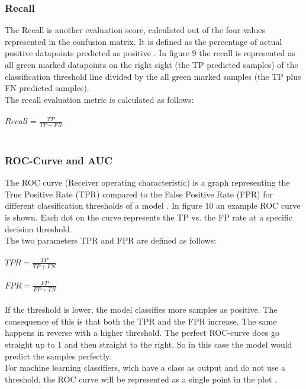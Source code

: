 \documentclass[../masterarbeit.tex]{subfiles}
\begin{document}
\subsubsection{Recall}
The Recall is another evaluation score, calculated out of the four values represented in the confusion matrix. It is defined as the percentage of actual positive datapoints predicted as positive \textcite[]{Google_Precision_Recall:2022}. In figure 9 the recall is represented as all green marked datapoints on the right sight (the TP predicted samples) of the classification threshold line divided by the all green marked samples (the TP plus FN predicted samples). \\
The recall evaluation metric is calculated as follows:
\\~\\
\(Recall = \frac{TP}{TP + FN} \) \hfill \textcite[]{Kartik_evaluation:2022} \\~\\


\subsubsection{ROC-Curve and AUC}
The ROC curve (Receiver operating characteristic) is a graph representing the True Positive Rate (TPR) compared to the False Positive Rate (FPR) for different classification thresholds of a model \textcite[]{Google_ROC_AUC:2022}. In figure 10 an example ROC curve is shown. Each dot on the curve represents the TP vs. the FP rate at a specific decision threshold.\\
The two parameters TPR and FPR are defined as follows:
\\~\\
\(TPR = \frac{TP}{TP + FN} \) \hfill \textcite[]{Google_ROC_AUC:2022} \\~\\
\(FPR = \frac{FP}{FP + TN} \) \hfill \textcite[]{Google_ROC_AUC:2022} 
\\~\\
If the threshold is lower, the model classifies more samples as positive. The consequence of this is that both the TPR and the FPR increase. The same happens in reverse with a higher threshold. The perfect ROC-curve does go straight up to 1 and then straight to the right. So in this case the model would predict the samples perfectly. \autocite[]{Google_ROC_AUC:2022} \autocite[]{Kartik_evaluation:2022} \\
For machine learning classifiers, wich have a class as output and do not use a threshold, the ROC curve will be represented as a single point in the plot \textcite[]{analyticsvidhya_evaluation:2022}. \\ 
\end{document}
